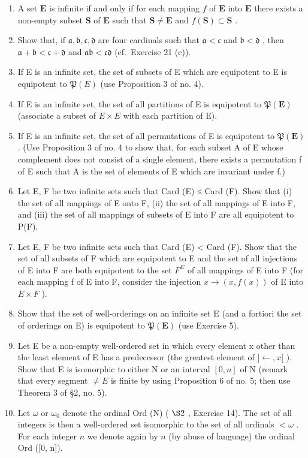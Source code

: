 \exercisegroup

\begin{enumerate}
\def\labelenumi{\arabic{enumi}.}
\item
  A set \(\mathbf{E}\) is infinite if and only if for each mapping \(f\) of \(\mathbf{E}\) into \(\mathbf{E}\) there exists a non-empty subset \(\mathbf{S}\) of \(\mathbf{E}\) such that \(\mathbf{S} \neq \mathbf{E}\) and \(f(\mathbf{S}) \subset \mathbf{S}\) .
\item
  Show that, if \(\mathfrak{a}, \mathfrak{b}, \mathfrak{c}, \mathfrak{d}\) are four cardinals such that \(\mathfrak{a} < \mathfrak{c}\) and \(\mathfrak{b} < \mathfrak{d}\) , then \(\mathfrak{a} + \mathfrak{b} < \mathfrak{c} + \mathfrak{d}\) and \(\mathfrak{a}\mathfrak{b} < \mathfrak{c}\mathfrak{d}\) (cf.~Exercise 21 (c)).
\item
  If E is an infinite set, the set of subsets of E which are equipotent to E is equipotent to \(\mathfrak{P}(E)\) (use Proposition 3 of no. 4).
\item
  If E is an infinite set, the set of all partitions of E is equipotent to \(\mathfrak{P}(\mathbf{E})\) (associate a subset of \(E \times E\) with each partition of E).
\item
  If E is an infinite set, the set of all permutations of E is equipotent to \(\mathfrak{P}(\mathbf{E})\) . (Use Proposition 3 of no. 4 to show that, for each subset A of E whose complement does not consist of a single element, there exists a permutation f of E such that A is the set of elements of E which are invariant under f.)
\item
  Let E, F be two infinite sets such that Card (E) ≤ Card (F). Show that (i) the set of all mappings of E onto F, (ii) the set of all mappings of E into F, and (iii) the set of all mappings of subsets of E into F are all equipotent to P(F).
\item
  Let E, F be two infinite sets such that Card (E) \textless{} Card (F). Show that the set of all subsets of F which are equipotent to E and the set of all injections of E into F are both equipotent to the set \(F^{E}\) of all mappings of E into F (for each mapping f of E into F, consider the injection \(x \to (x, f(x))\) of E into \(E \times F\) ).
\item
  Show that the set of well-orderings on an infinite set E (and a fortiori the set of orderings on E) is equipotent to \(\mathfrak{P}(\mathbf{E})\) (use Exercise 5).
\item
  Let E be a non-empty well-ordered set in which every element x other than the least element of E has a predecessor (the greatest element of \(] \leftarrow, x[\) ). Show that E is isomorphic to either N or an interval \([0, n]\) of N (remark that every segment \(\neq E\) is finite by using Proposition 6 of no. 5; then use Theorem 3 of §2, no. 5).
\item
  Let \(\omega\) or \(\omega_0\) denote the ordinal Ord (N) ( \(\S 2\) , Exercise 14). The set of all integers is then a well-ordered set isomorphic to the set of all ordinals \(< \omega\) . For each integer \(n\) we denote again by \(n\) (by abuse of language) the ordinal Ord ({[}0, n{]}).
\end{enumerate}


